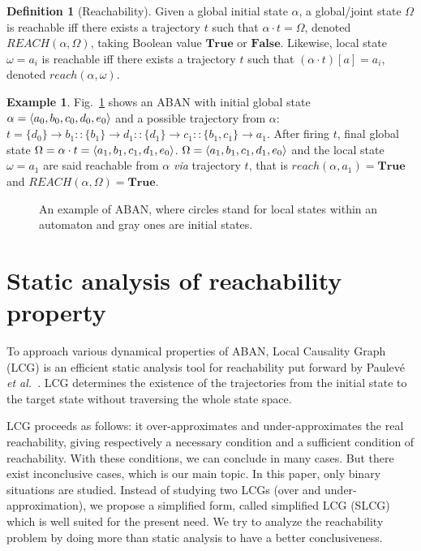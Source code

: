 \documentclass{article}
\newcommand{\acm}[3]{\{#1\}\rightarrow#3}
\theoremstyle{definition}
\newtheorem{definition}{Definition}
\newtheorem{example}{Example}
\DeclarePairedDelimiter{\init}{\langle}{\rangle}
\begin{document}
\begin{definition}[Reachability]
Given a global initial state $\alpha$, a global/joint state $\Omega$ is reachable iff there exists a trajectory $t$ such that $\alpha\cdot t=\Omega$, denoted $REACH(\alpha, \Omega)$, taking Boolean value $\mathbf{True}$ or $\mathbf{False}$.
Likewise, local state $\omega=a_i$ is reachable iff there exists a trajectory $t$ such that $(\alpha\cdot t)[a]=a_i$, denoted $reach(\alpha, \omega)$.
\end{definition}
\begin{example}\label{example:aban}
Fig.~\ref{fig:1} shows an ABAN with initial global state $\alpha=\init{ a_0,b_0,c_0,d_0,e_0}$ and a possible trajectory from $\alpha$: $t=\acm{d_0}{b_0}{b_1}::\acm{b_1}{d_0}{d_1}::\acm{d_1}{c_0}{c_1}::\acm{b_1,c_1}{a_0}{a_1}$. After firing $t$, final global state $\Omega=\alpha\cdot t=\init{a_1,b_1,c_1,d_1,e_0}$.
$\Omega=\init{ a_1,b_1,c_1,d_1,e_0}$ and the local state $\omega=a_1$ are said reachable from $\alpha$ \textit{via} trajectory $t$, that is $reach(\alpha,a_1)=\mathbf{True}$ and $REACH(\alpha,\Omega)=\mathbf{True}$.
\end{example}
\begin{figure}[ht]
\centering

\caption{An example of ABAN, where circles stand for local states within an automaton and gray ones are initial states.}\label{fig:1}
\end{figure}	

\section{Static analysis of reachability property}\label{sect:3}
To approach various dynamical properties of ABAN, Local Causality Graph (LCG) is an efficient static analysis tool for reachability put forward by Paulev\'e \textit{et al.}~\cite{pauleve2011}. 
LCG determines the existence of the trajectories from the initial state to the target state without traversing the whole state space.

LCG proceeds as follows: it over-approximates and under-approximates the real reachability, giving respectively a necessary condition and a sufficient condition of reachability. 
With these conditions, we can conclude in many cases.
But there exist inconclusive cases, which is our main topic.
In this paper, only binary situations are studied.
Instead of studying two LCGs (over and under-approximation), we propose a simplified form, called simplified LCG (SLCG) which is well suited for the present need.
We try to analyze the reachability problem by doing more than static analysis to have a better conclusiveness.
\end{document}
